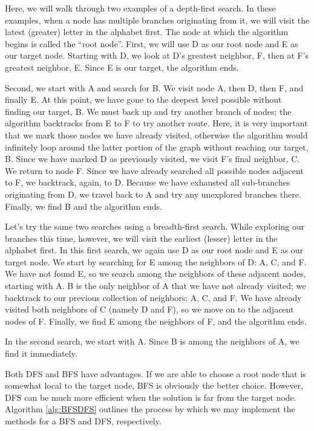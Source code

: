 Here, we will walk through two examples of a depth-first search.
In these examples, when a node has multiple branches originating from it,
we will visit the latest (greater) letter in the alphabet first.
The node at which the algorithm begins is called the ``root node''.
First, we will use D as our root node and E as our target node.
Starting with D, we look at D's greatest neighbor, F, then at F's greatest
neighbor, E. Since E is our target, the algorithm ends.

Second, we start with A and search for B.
We visit node A, then D, then F, and finally E.
At this point, we have gone to the deepest level possible without finding our target, B.
We must back up and try another branch of nodes;
the algorithm backtracks from E to F to try another route.
Here, it is very important that we mark those nodes we have already visited,
otherwise the algorithm would infinitely loop around the latter portion of
the graph without reaching our target, B. Since we have marked D as previously visited, we visit F's final neighbor, C.
We return to node F. Since we have already
searched all possible nodes adjacent to F, we backtrack, again, to D. Because we have
exhausted all sub-branches originating from D, we travel back to A and try
any unexplored branches there. Finally, we find B and the algorithm ends.

Let's try the same two searches using a breadth-first search. While exploring our branches this time, however,
we will visit the earliest (lesser) letter in the alphabet first. In this first search, we again use D as our root node and
E as our target node.
We start by searching for E among the neighbors of D: A, C, and F.
We have not found E, so we search among the neighbors of these adjacent nodes, starting with A.
B is the only neighbor of A that we have not already visited; we backtrack to our previous collection of neighbors: A, C, and F.
We have already visited both neighbors of C (namely D and F), so we move on to the adjacent nodes of F. Finally, we find E among the neighbors of F, and the algorithm ends.

In the second search, we start with A.
Since B is among the neighbors of A, we find it immediately.

Both DFS and BFS have advantages.
If we are able to choose a root node that is somewhat local to the target node, BFS is obviously the better choice. However,
DFS can be much more efficient when the solution is far from the target node.
Algorithm \ref{alg:BFSDFS} outlines the process by which we may implement the methods for a BFS and DFS, respectively.

